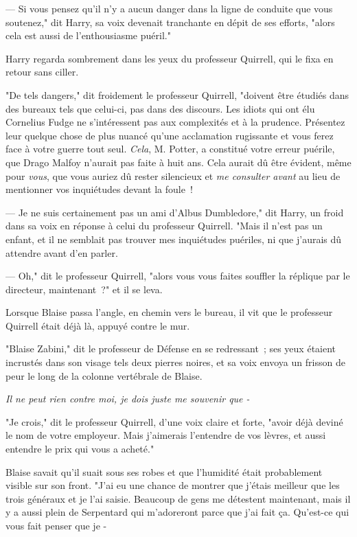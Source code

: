 --- Si vous pensez qu'il n'y a aucun danger dans la ligne de conduite que vous soutenez," dit Harry, sa voix devenait tranchante en dépit de ses efforts, "alors cela est aussi de l'enthousiasme puéril."

Harry regarda sombrement dans les yeux du professeur Quirrell, qui le fixa en retour sans ciller.

"De tels dangers," dit froidement le professeur Quirrell, "doivent être étudiés dans des bureaux tels que celui-ci, pas dans des discours. Les idiots qui ont élu Cornelius Fudge ne s'intéressent pas aux complexités et à la prudence. Présentez leur quelque chose de plus nuancé qu'une acclamation rugissante et vous ferez face à votre guerre tout seul. \emph{Cela}, M. Potter, a constitué votre erreur puérile, que Drago Malfoy n'aurait pas faite à huit ans. Cela aurait dû être évident, même pour \emph{vous}, que vous auriez dû rester silencieux et \emph{me consulter avant} au lieu de mentionner vos inquiétudes devant la foule~!

--- Je ne suis certainement pas un ami d'Albus Dumbledore," dit Harry, un froid dans sa voix en réponse à celui du professeur Quirrell. "Mais il n'est pas un enfant, et il ne semblait pas trouver mes inquiétudes puériles, ni que j'aurais dû attendre avant d'en parler.

--- Oh," dit le professeur Quirrell, "alors vous vous faites souffler la réplique par le directeur, maintenant~?" et il se leva.

\later

Lorsque Blaise passa l'angle, en chemin vers le bureau, il vit que le professeur Quirrell était déjà là, appuyé contre le mur.

"Blaise Zabini," dit le professeur de Défense en se redressant~; ses yeux étaient incrustés dans son visage tels deux pierres noires, et sa voix envoya un frisson de peur le long de la colonne vertébrale de Blaise.

\emph{Il ne peut rien contre moi, je dois juste me souvenir que -}

"Je crois," dit le professeur Quirrell, d'une voix claire et forte, "avoir déjà deviné le nom de votre employeur. Mais j'aimerais l'entendre de vos lèvres, et aussi entendre le prix qui vous a acheté."

Blaise savait qu'il suait sous ses robes et que l'humidité était probablement visible sur son front. "J'ai eu une chance de montrer que j'étais meilleur que les trois généraux et je l'ai saisie. Beaucoup de gens me détestent maintenant, mais il y a aussi plein de Serpentard qui m'adoreront parce que j'ai fait ça. Qu'est-ce qui vous fait penser que je -

